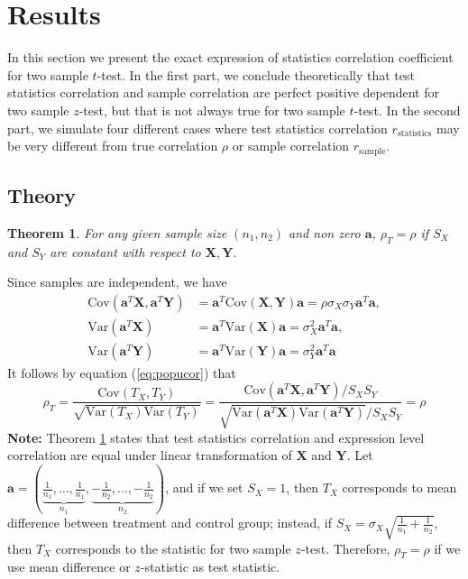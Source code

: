 \documentclass[12pt, a4paper]{article}
\newtheorem{theorem}{Theorem}       %
\newcommand{\cov}{\text{Cov}}
\newcommand{\var}{\text{Var}}
\begin{document}
	
	\section{Results}\label{section:tcorresults}
	
	In this section we present the exact expression of statistics correlation coefficient for two
	sample $t$-test. In the first part, we conclude theoretically that test statistics correlation and
	sample correlation are perfect positive dependent for two sample $z$-test, but that is not always
	true for two sample $t$-test. In the second part, we simulate four different cases where test
	statistics correlation $r_{\text{statistics}}$ may be very different from true correlation $\rho$ or
	sample correlation $r_{\text{sample}}$. 
	\subsection{Theory}
	\begin{theorem}\label{thm:lineartransformation} 
		For any given sample size $(n_1, n_2)$ and non zero $\bm a$, $\rho_T=\rho$ if $S_X$ and $S_Y$ are constant with respect to $\bm X, \bm Y$. 
	\end{theorem}
	 Since samples are independent, we have 
	\begin{equation}
	\begin{aligned}
		\cov(\bm a^T\bm X, \bm a^T\bm Y) &= \bm a^T \cov(\bm X, \bm Y)\bm a  = \rho\sigma_X\sigma_Y\bm a^T\bm a, \\
		\var(\bm a^T\bm X)& = \bm a^T\var(\bm X)\bm a   = \sigma_X^2\bm a^T\bm a, \\
		\var(\bm a^T\bm Y)& = \bm a^T\var(\bm Y)\bm a   = \sigma_Y^2\bm a^T\bm a 
	\end{aligned}
	\end{equation}
	It follows by equation (\ref{eq:popucor}) that
	\begin{equation}
	\rho_T = \dfrac{\cov(T_X, T_Y)}{\sqrt{\var(T_X)\var(T_Y)}} = \dfrac{\cov(\bm a^T\bm X, \bm a^T\bm Y)/S_XS_Y}{\sqrt{\var(\bm a^T\bm X)\var(\bm a^T\bm Y)}/S_XS_Y} = \rho
	\end{equation}
	\textbf{Note:} Theorem \ref{thm:lineartransformation} states that test statistics correlation and expression level correlation are equal under linear transformation of $\bm X$ and $\bm Y$. Let $\bm a  = (\underbrace{\frac{1}{n_1}, \ldots, \frac{1}{n_1}}_{n_1}, \underbrace{-\frac{1}{n_2}, \ldots, -\frac{1}{n_2}}_{n_2})$, and if we set $S_X=1$, then $T_X$ corresponds to mean difference between treatment and control group; instead, if $S_X = \sigma_X\sqrt{\frac{1}{n_1} + \frac{1}{n_2}}$, then $T_X$ corresponds to the statistic for two sample $z$-test. Therefore, $\rho_T=\rho$ if we use mean difference or $z$-statistic as test statistic.
	
\end{document}
